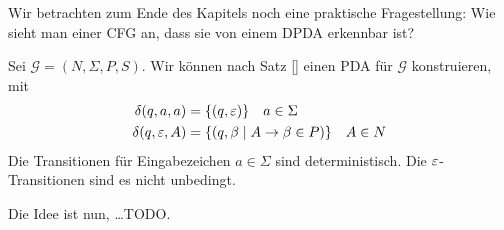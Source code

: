 Wir betrachten zum Ende des Kapitels noch eine praktische Fragestellung: Wie sieht man einer CFG an, dass sie von einem DPDA erkennbar ist?

Sei $\mathcal{G} = (N, \Sigma, P, S)$.
Wir können nach Satz \ref{} einen PDA für $\mathcal{G}$ konstruieren, mit
\begin{align*}
  \delta(q, a, a) &= \{(q, \varepsilon)\} \quad a \in \Sigma \\
  \delta(q, \varepsilon, A) &= \{(q, \beta \mid A \to \beta \in P)\} \quad A \in N
\end{align*}
Die Transitionen für Eingabezeichen $a \in \Sigma$ sind deterministisch.
Die $\varepsilon$-Transitionen sind es nicht unbedingt.

Die Idee ist nun, \ldots TODO.


